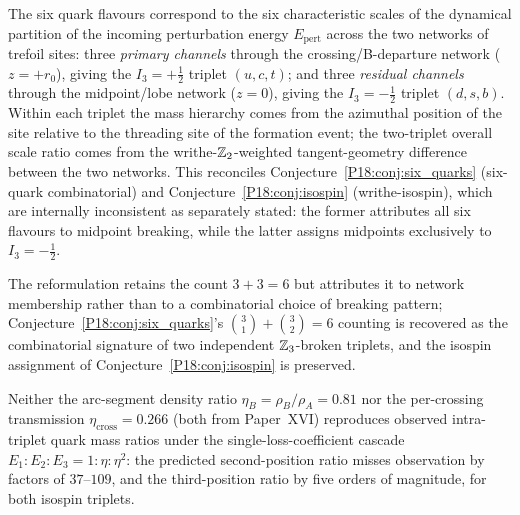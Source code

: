 \begin{conjecture}
\label{P19:conj:six_quarks_reformulated}
The six quark flavours correspond to the six characteristic scales of
the dynamical partition of the incoming perturbation energy
$E_{\mathrm{pert}}$ across the two networks of trefoil sites: three
\emph{primary channels} through the crossing/B-departure network
($z=+r_0$), giving the $I_3=+\tfrac12$ triplet $(u,c,t)$; and three
\emph{residual channels} through the midpoint/lobe network ($z=0$),
giving the $I_3=-\tfrac12$ triplet $(d,s,b)$. Within each triplet the
mass hierarchy comes from the azimuthal position of the site relative
to the threading site of the formation event; the two-triplet overall
scale ratio comes from the writhe-$\mathbb{Z}_2$-weighted tangent-geometry
difference between the two networks. This reconciles
Conjecture~\ref{P18:conj:six_quarks} (six-quark combinatorial) and
Conjecture~\ref{P18:conj:isospin} (writhe-isospin), which are
internally inconsistent as separately stated: the former attributes
all six flavours to midpoint breaking, while the latter assigns
midpoints exclusively to $I_3=-\tfrac12$.
\end{conjecture}

\begin{remark}
\label{P19:rem:sextet_check}
The reformulation retains the count $3+3=6$ but attributes it to
network membership rather than to a combinatorial choice of breaking
pattern; Conjecture~\ref{P18:conj:six_quarks}'s
$\binom31+\binom32=6$ counting is recovered as the combinatorial
signature of two independent $\mathbb{Z}_3$-broken triplets, and the
isospin assignment of Conjecture~\ref{P18:conj:isospin} is preserved.
\end{remark}


\begin{proposition}
\label{P19:prop:cascade_falsified}
Neither the arc-segment density ratio $\eta_B=\rho_B/\rho_A=0.81$ nor
the per-crossing transmission $\eta_{\mathrm{cross}}=0.266$ (both from
Paper~XVI) reproduces observed intra-triplet quark mass ratios under
the single-loss-coefficient cascade $E_1:E_2:E_3=1:\eta:\eta^2$: the
predicted second-position ratio misses observation by factors of
$37$--$109$, and the third-position ratio by five orders of
magnitude, for both isospin triplets.
\end{proposition}

